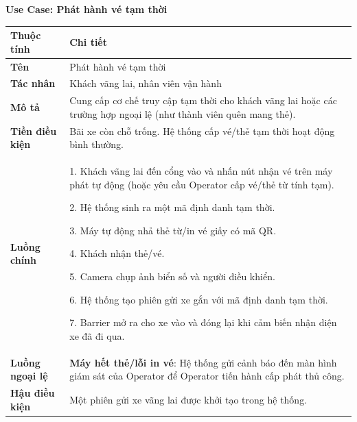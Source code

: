 \noindent \textbf{Use Case: Phát hành vé tạm thời} \\
\renewcommand{\arraystretch}{1.6}
\begin{xltabular}{\textwidth}{|l|X|}
\hline
\textbf{Thuộc tính} & \textbf{Chi tiết} \\
\hline
\textbf{Tên} & Phát hành vé tạm thời \\
\hline
\textbf{Tác nhân} & Khách vãng lai, nhân viên vận hành \\
\hline
\textbf{Mô tả} & Cung cấp cơ chế truy cập tạm thời cho khách vãng lai hoặc các trường hợp ngoại lệ (như thành viên quên mang thẻ). \\
\hline
\textbf{Tiền điều kiện} & Bãi xe còn chỗ trống. Hệ thống cấp vé/thẻ tạm thời hoạt động bình thường. \\
\hline
\textbf{Luồng chính} & 
1. Khách vãng lai đến cổng vào và nhấn nút nhận vé trên máy phát tự động (hoặc yêu cầu Operator cấp vé/thẻ từ tính tạm).

2. Hệ thống sinh ra một mã định danh tạm thời.

3. Máy tự động nhả thẻ từ/in vé giấy có mã QR.

4. Khách nhận thẻ/vé.

5. Camera chụp ảnh biển số và người điều khiển.

6. Hệ thống tạo phiên gửi xe gắn với mã định danh tạm thời.

7. Barrier mở ra cho xe vào và đóng lại khi cảm biến nhận diện xe đã đi qua.\\

\hline
\textbf{Luồng ngoại lệ} & 
\textbf{Máy hết thẻ/lỗi in vé}: Hệ thống gửi cảnh báo đến màn hình giám sát của Operator để Operator tiến hành cấp phát thủ công.\\
\hline
\textbf{Hậu điều kiện} & Một phiên gửi xe vãng lai được khởi tạo trong hệ thống. \\
\hline
\end{xltabular}

